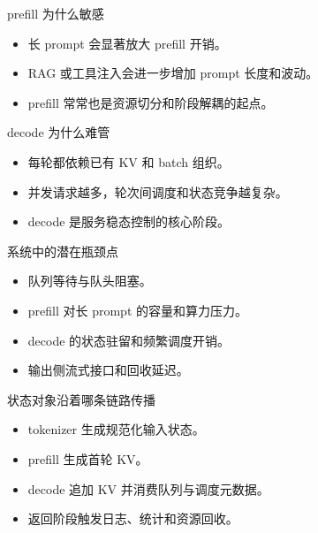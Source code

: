 \begin{frame}{prefill 为什么敏感}
  \begin{itemize}
    \item 长 prompt 会显著放大 prefill 开销。
    \item RAG 或工具注入会进一步增加 prompt 长度和波动。
    \item prefill 常常也是资源切分和阶段解耦的起点。
  \end{itemize}
\end{frame}

\begin{frame}{decode 为什么难管}
  \begin{itemize}
    \item 每轮都依赖已有 KV 和 batch 组织。
    \item 并发请求越多，轮次间调度和状态竞争越复杂。
    \item decode 是服务稳态控制的核心阶段。
  \end{itemize}
\end{frame}

\begin{frame}{系统中的潜在瓶颈点}
  \begin{itemize}
    \item 队列等待与队头阻塞。
    \item prefill 对长 prompt 的容量和算力压力。
    \item decode 的状态驻留和频繁调度开销。
    \item 输出侧流式接口和回收延迟。
  \end{itemize}
\end{frame}

\begin{frame}{状态对象沿着哪条链路传播}
  \begin{itemize}
    \item tokenizer 生成规范化输入状态。
    \item prefill 生成首轮 KV。
    \item decode 追加 KV 并消费队列与调度元数据。
    \item 返回阶段触发日志、统计和资源回收。
  \end{itemize}
\end{frame}

